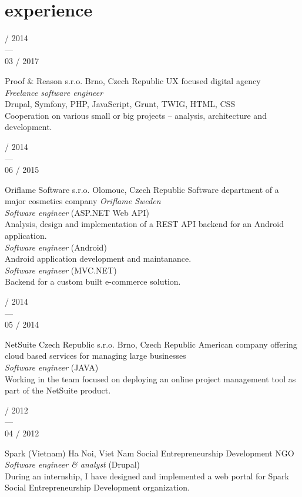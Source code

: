 \documentclass[]{friggeri-cv} %
\begin{document}
\section{experience}
\begin{entrylist}
\entry
{\parbox[t]{2cm}{ / 2014 \\ --- \\ 03 / 2017}}
{Proof \& Reason s.r.o.}
{Brno, Czech Republic}
{UX focused digital agency \medskip\\
\emph{Freelance software engineer} \\
Drupal, Symfony, PHP, JavaScript, Grunt, TWIG, HTML, CSS \smallskip\\
Cooperation on various small or big projects -- analysis, architecture and development. \medskip
}
\entry
{\parbox[t]{2cm}{ / 2014 \\ --- \\ 06 / 2015}}
{Oriflame Software s.r.o.}
{Olomouc, Czech Republic}
{Software department of a major cosmetics company \emph{Oriflame Sweden}\medskip\\
\emph{Software engineer} (ASP.NET Web API) \\
Analysis, design and implementation of a REST API backend for an Android application. \smallskip\\
\emph{Software engineer} (Android) \\ 
Android application development and maintanance. \smallskip\\
\emph{Software engineer} (MVC.NET) \\
Backend for a custom built e-commerce solution. \medskip
}
\entry
{\parbox[t]{2cm}{ / 2014 \\ --- \\ 05 / 2014}}
{NetSuite Czech Republic s.r.o.}
{Brno, Czech Republic}
{American company offering cloud based services for managing large businesses\medskip\\
\emph{Software engineer} (JAVA)\\
Working in the team focused on deploying an online project management tool as part of the NetSuite product. \medskip
}
\entry
{\parbox[t]{2cm}{ / 2012 \\ --- \\ 04 / 2012}}
{Spark (Vietnam)}
{Ha Noi, Viet Nam}
{Social Entrepreneurship Development NGO\medskip\\
\emph{Software engineer \& analyst} (Drupal) \\
During an internship, I have designed and implemented a web portal for Spark Social Entrepreneurship Development organization. \medskip
}
\end{entrylist}
\end{document}

